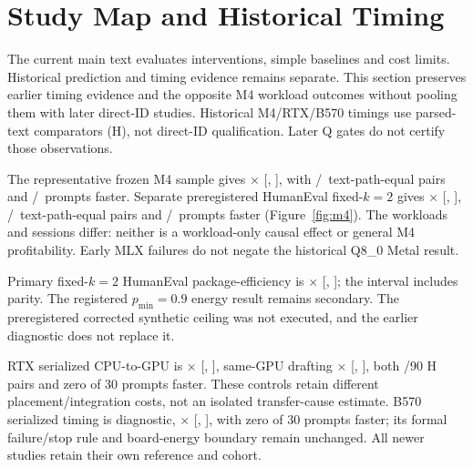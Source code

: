 \documentclass{article}
\begin{document}
\section{Study Map and Historical Timing}
\label{app:history}
The current main text evaluates interventions, simple baselines and cost limits. Historical prediction and timing evidence remains separate. This section preserves earlier timing evidence and the opposite M4 workload outcomes without pooling them with later direct-ID studies. Historical M4/RTX/B570 timings use parsed-text comparators (H), not direct-ID qualification. Later Q gates do not certify those observations.



The representative frozen M4 sample gives \MRepSpeed$\times$ [\MRepLo, \MRepHi], with \MRepExact/\MRepPairs\ text-path-equal pairs and \MRepFaster/\MRepN\ prompts faster. Separate preregistered HumanEval fixed-$k=2$ gives \MHEspeed$\times$ [\MHElo, \MHEhi], \MHEexact/\MHEpairs\ text-path-equal pairs and \MHEfaster/\MHEprompts\ prompts faster (Figure~\ref{fig:m4}). The workloads and sessions differ: neither is a workload-only causal effect or general M4 profitability. Early MLX failures do not negate the historical Q8\_0 Metal result.

Primary fixed-$k=2$ HumanEval package-efficiency is \MHEenergy$\times$ [\MHEenergyLo, \MHEenergyHi]; the interval includes parity. The registered $p_{\min}=0.9$ energy result remains secondary. The preregistered corrected synthetic ceiling was not executed, and the earlier diagnostic does not replace it.

RTX serialized CPU-to-GPU is \RTXcpuSpeed$\times$ [\RTXcpuLo, \RTXcpuHi], same-GPU drafting \RTXgpuSpeed$\times$ [\RTXgpuLo, \RTXgpuHi], both \RTXexact/90 H pairs and zero of 30 prompts faster. These controls retain different placement/integration costs, not an isolated transfer-cause estimate. B570 serialized timing is diagnostic, \BSpeed$\times$ [\BLo, \BHi], with zero of 30 prompts faster; its formal failure/stop rule and board-energy boundary remain unchanged. All newer studies retain their own reference and cohort.




\clearpage


\end{document}
